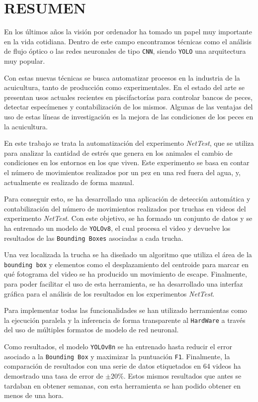 \section*{RESUMEN}
\thispagestyle{abstract}
En los últimos años la visión por ordenador ha tomado un papel muy importante en la vida cotidiana. Dentro de este campo encontramos técnicas como el análisis de 
flujo óptico o las redes neuronales de tipo \texttt{CNN}, siendo \texttt{YOLO} una arquitectura muy popular.

Con estas nuevas técnicas se busca automatizar procesos en la industria de la acuicultura, tanto de producción como experimentales. En el estado del arte se presentan 
usos actuales recientes en piscifactorías para controlar bancos de peces, detectar especímenes y contabilización de los mismos. Algunas de las ventajas del uso de estas 
líneas de investigación es la mejora de las condiciones de los peces en la acuicultura. 

En este trabajo se trata la automatización del experimento \textit{NetTest}, que se utiliza para analizar la cantidad de estrés que genera en los animales el cambio de 
condiciones en los entornos en los que viven. Este experimento se basa en contar el número de movimientos realizados por un pez en una red fuera del agua, y, actualmente 
es realizado de forma manual.

Para conseguir esto, se ha desarrollado una aplicación de detección automática y contabilización del número de movimientos realizados por truchas en videos del experimento 
\textit{NetTest}. Con este objetivo, se ha formado un conjunto de datos y se ha entrenado un modelo de \texttt{YOLOv8}, el cual procesa el video y devuelve los resultados de 
las \texttt{Bounding Boxes} asociadas a cada trucha.

Una vez localizada la trucha se ha diseñado un algoritmo que utiliza el área de la \texttt{bounding box} y elementos como el desplazamiento del centroide para marcar en qué 
fotograma del video se ha producido un movimiento de escape. Finalmente, para poder facilitar el uso de esta herramienta, se ha desarrollado una interfaz gráfica para 
el análisis de los resultados en los experimentos \textit{NetTest}.

Para implementar todas las funcionalidades se han utilizado herramientas como la ejecución paralela y la inferencia de forma transparente al \texttt{HardWare} a través del uso 
de múltiples formatos de modelo de red neuronal.

Como resultados, el modelo \texttt{YOLOv8n} se ha entrenado hasta reducir el error asociado a la \texttt{Bounding Box} y maximizar la puntuación \texttt{F1}. Finalmente, la 
comparación de resultados con una serie de datos etiquetados en 64 videos ha demostrado una tasa de error de \texttt{$ \pm 20\% $}. Estos mismos resultados que antes se tardaban 
en obtener semanas, con esta herramienta se han podido obtener en menos de una hora.